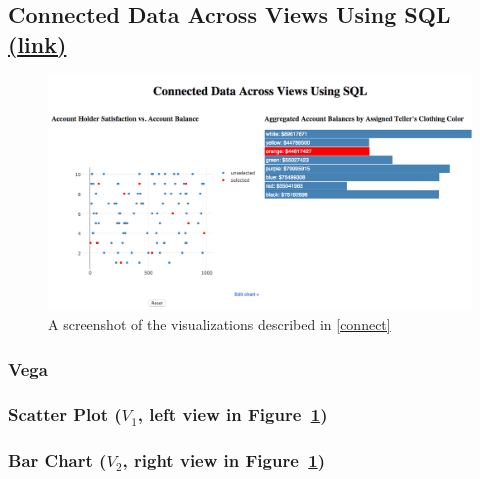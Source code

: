 \documentclass[fleqn]{sigplanconf}
\begin{document}
\subsection{Connected Data Across Views Using SQL \href{http://randy.cs.columbia.edu/lineage/pgbench-connect/pgbench.html}{(\underline{link})}}\label{connect}
\begin{figure}[H]
	\includegraphics[width=\columnwidth]{figures/connect}
	\caption{A screenshot of the visualizations described in \autoref{connect}
	}
	\label{fig_connect}
\end{figure}
\subsubsection{Vega}
\subsubsection*{Scatter Plot ($V_1$, left view in Figure~\ref{fig_connect})}

\subsubsection*{Bar Chart ($V_2$, right view in Figure~\ref{fig_connect})}

\end{document}
